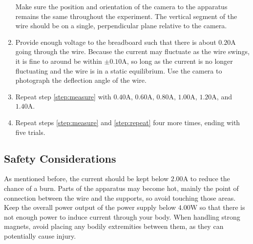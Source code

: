 \begin{enumerate}
	Make sure the position and orientation of the camera to the apparatus remains the same throughout the experiment.
	The vertical segment of the wire should be on a single, perpendicular plane relative to the camera.
	\item Provide enough voltage to the breadboard such that there is about $0.20\si{\ampere}$ going through the wire.
	Because the current may fluctuate as the wire swings, it is fine to around be within $\pm0.10\si{\ampere}$, so long as the current is no longer fluctuating and the wire is in a static equilibrium.
	Use the camera to photograph the deflection angle of the wire. \label{step:measure}
	\item Repeat step \ref{step:measure} with $0.40\si{\ampere}$, $0.60\si{\ampere}$, $0.80\si{\ampere}$, $1.00\si{\ampere}$, $1.20\si{\ampere}$, and $1.40\si{\ampere}$.\label{step:repeat}
	\item Repeat steps \ref{step:measure} and \ref{step:repeat} four more times, ending with five trials.
\end{enumerate}

\subsection*{Safety Considerations}

As mentioned before, the current should be kept below $2.00\si{\ampere}$ to reduce the chance of a burn.
Parts of the apparatus may become hot, mainly the point of connection between the wire and the supports, so avoid touching those areas.
Keep the overall power output of the power supply below $4.00\si{\watt}$ so that there is not enough power to induce current through your body.
When handling strong magnets, avoid placing any bodily extremities between them, as they can potentially cause injury.
